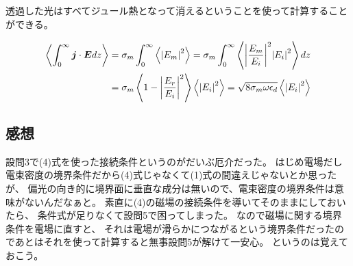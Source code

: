 \documentclass[../../master.tex]{subfiles}
\begin{document}
\subsection{}
透過した光はすべてジュール熱となって消えるということを使って計算することができる。

\begin{equation}\begin{aligned}[b]
    \ev{\int_{0}^{\infty}\vb*{j}\cdot \vb*{E}dz}
    &= \sigma_m \int_{0}^{\infty} \ev{\abs{E_m}^2}
    = \sigma_m \int_{0}^{\infty} \ev{\abs{\frac{E_m}{E_i}}^2\abs{E_i}^2}dz\\
    &= \sigma_m  \ev{1-\abs{\frac{E_r}{E_i}}^2}\ev{\abs{E_i}^2}
    = \sqrt{8\sigma_m \omega \epsilon_d}\ev{\abs{E_i}^2}
\end{aligned}\end{equation}

\subsection*{感想}
設問3で(4)式を使った接続条件というのがだいぶ厄介だった。
はじめ電場だし電束密度の境界条件だから(4)式じゃなくて(1)式の間違えじゃないとか思ったが、
偏光の向き的に境界面に垂直な成分は無いので、電束密度の境界条件は意味がないんだなぁと。
素直に(4)の磁場の接続条件を導いてそのままにしておいたら、
条件式が足りなくて設問5で困ってしまった。
なので磁場に関する境界条件を電場に直すと、
それは電場が滑らかにつながるという境界条件だったのであとはそれを使って計算すると無事設問5が解けて一安心。
というのは覚えておこう。
\end{document}
